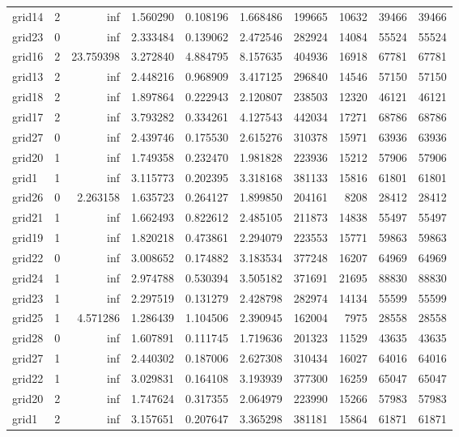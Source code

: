 \begin{longtable}{|l|r|r|r|r|r|r|r|r|r|}
grid14 & 2 & inf & 1.560290 & 0.108196 & 1.668486 & 199665 & 10632 & 39466 & 39466 \\
grid23 & 0 & inf & 2.333484 & 0.139062 & 2.472546 & 282924 & 14084 & 55524 & 55524 \\
grid16 & 2 & 23.759398 & 3.272840 & 4.884795 & 8.157635 & 404936 & 16918 & 67781 & 67781 \\
grid13 & 2 & inf & 2.448216 & 0.968909 & 3.417125 & 296840 & 14546 & 57150 & 57150 \\
grid18 & 2 & inf & 1.897864 & 0.222943 & 2.120807 & 238503 & 12320 & 46121 & 46121 \\
grid17 & 2 & inf & 3.793282 & 0.334261 & 4.127543 & 442034 & 17271 & 68786 & 68786 \\
grid27 & 0 & inf & 2.439746 & 0.175530 & 2.615276 & 310378 & 15971 & 63936 & 63936 \\
grid20 & 1 & inf & 1.749358 & 0.232470 & 1.981828 & 223936 & 15212 & 57906 & 57906 \\
grid1 & 1 & inf & 3.115773 & 0.202395 & 3.318168 & 381133 & 15816 & 61801 & 61801 \\
grid26 & 0 & 2.263158 & 1.635723 & 0.264127 & 1.899850 & 204161 & 8208 & 28412 & 28412 \\
grid21 & 1 & inf & 1.662493 & 0.822612 & 2.485105 & 211873 & 14838 & 55497 & 55497 \\
grid19 & 1 & inf & 1.820218 & 0.473861 & 2.294079 & 223553 & 15771 & 59863 & 59863 \\
grid22 & 0 & inf & 3.008652 & 0.174882 & 3.183534 & 377248 & 16207 & 64969 & 64969 \\
grid24 & 1 & inf & 2.974788 & 0.530394 & 3.505182 & 371691 & 21695 & 88830 & 88830 \\
grid23 & 1 & inf & 2.297519 & 0.131279 & 2.428798 & 282974 & 14134 & 55599 & 55599 \\
grid25 & 1 & 4.571286 & 1.286439 & 1.104506 & 2.390945 & 162004 & 7975 & 28558 & 28558 \\
grid28 & 0 & inf & 1.607891 & 0.111745 & 1.719636 & 201323 & 11529 & 43635 & 43635 \\
grid27 & 1 & inf & 2.440302 & 0.187006 & 2.627308 & 310434 & 16027 & 64016 & 64016 \\
grid22 & 1 & inf & 3.029831 & 0.164108 & 3.193939 & 377300 & 16259 & 65047 & 65047 \\
grid20 & 2 & inf & 1.747624 & 0.317355 & 2.064979 & 223990 & 15266 & 57983 & 57983 \\
grid1 & 2 & inf & 3.157651 & 0.207647 & 3.365298 & 381181 & 15864 & 61871 & 61871 \\

\end{longtable}
